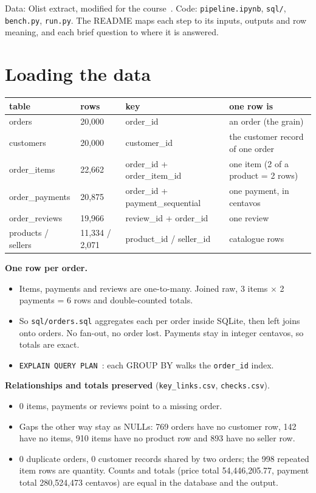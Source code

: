 \documentclass[11pt,a4paper]{article}
\newcommand{\file}[1]{\texttt{#1}}
\begin{document}
Data: Olist extract, modified for the course~\cite{olist}. Code: \file{pipeline.ipynb}, \file{sql/}, \file{bench.py}, \file{run.py}. The README maps each step to its inputs, outputs and row meaning, and each brief question to where it is answered.

\section{Loading the data}

\begin{center}\small
\begin{tabular}{llll}
\toprule
table & rows & key & one row is \\
\midrule
orders & 20,000 & order\_id & an order (the grain) \\
customers & 20,000 & customer\_id & the customer record of one order \\
order\_items & 22,662 & order\_id + order\_item\_id & one item (2 of a product = 2 rows) \\
order\_payments & 20,875 & order\_id + payment\_sequential & one payment, in centavos \\
order\_reviews & 19,966 & review\_id + order\_id & one review \\
products / sellers & 11,334 / 2,071 & product\_id / seller\_id & catalogue rows \\
\bottomrule
\end{tabular}
\end{center}

\textbf{One row per order.}
\begin{itemize}
  \item Items, payments and reviews are one-to-many. Joined raw, 3 items $\times$ 2 payments = 6 rows and double-counted totals.
  \item So \file{sql/orders.sql} aggregates each per order inside SQLite, then left joins onto orders. No fan-out, no order lost. Payments stay in integer centavos, so totals are exact.
  \item \file{EXPLAIN QUERY PLAN}~\cite{eqp}: each GROUP BY walks the \file{order\_id} index.
\end{itemize}

\textbf{Relationships and totals preserved} (\file{key\_links.csv}, \file{checks.csv}).
\begin{itemize}
  \item 0 items, payments or reviews point to a missing order.
  \item Gaps the other way stay as NULLs: 769 orders have no customer row, 142 have no items, 910 items have no product row and 893 have no seller row.
  \item 0 duplicate orders, 0 customer records shared by two orders; the 998 repeated item rows are quantity. Counts and totals (price total 54,446,205.77, payment total 280,524,473 centavos) are equal in the database and the output.
\end{itemize}
\end{document}
